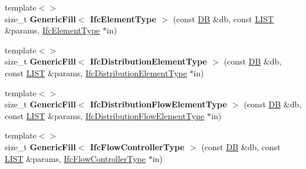 \begin{DoxyCompactItemize}
\item 
\hypertarget{namespace_assimp_1_1_s_t_e_p_acaca3693cdd01939d71a9c5e64d35ba1}{{\footnotesize template$<$$>$ }\\size\+\_\+t {\bfseries Generic\+Fill$<$ Ifc\+Element\+Type $>$} (const \hyperlink{class_assimp_1_1_s_t_e_p_1_1_d_b}{D\+B} \&db, const \hyperlink{class_assimp_1_1_s_t_e_p_1_1_e_x_p_r_e_s_s_1_1_l_i_s_t}{L\+I\+S\+T} \&params, \hyperlink{struct_assimp_1_1_i_f_c_1_1_ifc_element_type}{Ifc\+Element\+Type} $\ast$in)}\label{namespace_assimp_1_1_s_t_e_p_acaca3693cdd01939d71a9c5e64d35ba1}

\item 
\hypertarget{namespace_assimp_1_1_s_t_e_p_adbbcbc9067041f2d94fd6f862f3c51bb}{{\footnotesize template$<$$>$ }\\size\+\_\+t {\bfseries Generic\+Fill$<$ Ifc\+Distribution\+Element\+Type $>$} (const \hyperlink{class_assimp_1_1_s_t_e_p_1_1_d_b}{D\+B} \&db, const \hyperlink{class_assimp_1_1_s_t_e_p_1_1_e_x_p_r_e_s_s_1_1_l_i_s_t}{L\+I\+S\+T} \&params, \hyperlink{struct_assimp_1_1_i_f_c_1_1_ifc_distribution_element_type}{Ifc\+Distribution\+Element\+Type} $\ast$in)}\label{namespace_assimp_1_1_s_t_e_p_adbbcbc9067041f2d94fd6f862f3c51bb}

\item 
\hypertarget{namespace_assimp_1_1_s_t_e_p_ae6506382fd1e209c446117537d38e239}{{\footnotesize template$<$$>$ }\\size\+\_\+t {\bfseries Generic\+Fill$<$ Ifc\+Distribution\+Flow\+Element\+Type $>$} (const \hyperlink{class_assimp_1_1_s_t_e_p_1_1_d_b}{D\+B} \&db, const \hyperlink{class_assimp_1_1_s_t_e_p_1_1_e_x_p_r_e_s_s_1_1_l_i_s_t}{L\+I\+S\+T} \&params, \hyperlink{struct_assimp_1_1_i_f_c_1_1_ifc_distribution_flow_element_type}{Ifc\+Distribution\+Flow\+Element\+Type} $\ast$in)}\label{namespace_assimp_1_1_s_t_e_p_ae6506382fd1e209c446117537d38e239}

\item 
\hypertarget{namespace_assimp_1_1_s_t_e_p_a50e6cf80585f6dbe0ba5f01cbb30822f}{{\footnotesize template$<$$>$ }\\size\+\_\+t {\bfseries Generic\+Fill$<$ Ifc\+Flow\+Controller\+Type $>$} (const \hyperlink{class_assimp_1_1_s_t_e_p_1_1_d_b}{D\+B} \&db, const \hyperlink{class_assimp_1_1_s_t_e_p_1_1_e_x_p_r_e_s_s_1_1_l_i_s_t}{L\+I\+S\+T} \&params, \hyperlink{struct_assimp_1_1_i_f_c_1_1_ifc_flow_controller_type}{Ifc\+Flow\+Controller\+Type} $\ast$in)}\label{namespace_assimp_1_1_s_t_e_p_a50e6cf80585f6dbe0ba5f01cbb30822f}


\end{DoxyCompactItemize}
